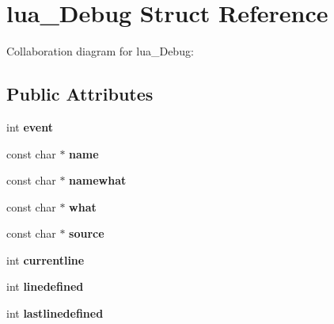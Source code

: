 \hypertarget{structlua___debug}{\section{lua\+\_\+\+Debug Struct Reference}
\label{structlua___debug}
}


Collaboration diagram for lua\+\_\+\+Debug\+:
\subsection*{Public Attributes}
\begin{DoxyCompactItemize}
\item 
\hypertarget{structlua___debug_a6578d385d2322429a0fe87b79f1ddec0}{int {\bfseries event}}\label{structlua___debug_a6578d385d2322429a0fe87b79f1ddec0}

\item 
\hypertarget{structlua___debug_a2978ab7f2ade479a003beb16d3b7a993}{const char $\ast$ {\bfseries name}}\label{structlua___debug_a2978ab7f2ade479a003beb16d3b7a993}

\item 
\hypertarget{structlua___debug_a7e8c201950ea4dd3f2c7df9e1201019a}{const char $\ast$ {\bfseries namewhat}}\label{structlua___debug_a7e8c201950ea4dd3f2c7df9e1201019a}

\item 
\hypertarget{structlua___debug_afbf8df5f26e9c345378a7eb402eed081}{const char $\ast$ {\bfseries what}}\label{structlua___debug_afbf8df5f26e9c345378a7eb402eed081}

\item 
\hypertarget{structlua___debug_a422bceba8605d96bce4d19ce801a62e4}{const char $\ast$ {\bfseries source}}\label{structlua___debug_a422bceba8605d96bce4d19ce801a62e4}

\item 
\hypertarget{structlua___debug_a97b3ed36cdfdc6f2c694b253a3d96da6}{int {\bfseries currentline}}\label{structlua___debug_a97b3ed36cdfdc6f2c694b253a3d96da6}

\item 
\hypertarget{structlua___debug_a97cb69b18daa46d20fb1a13eec78661b}{int {\bfseries linedefined}}\label{structlua___debug_a97cb69b18daa46d20fb1a13eec78661b}

\item 
\hypertarget{structlua___debug_a4c69b9d30e54cf9071cd2987ede128eb}{int {\bfseries lastlinedefined}}\label{structlua___debug_a4c69b9d30e54cf9071cd2987ede128eb}


\end{DoxyCompactItemize}
